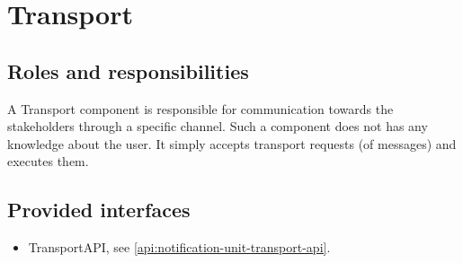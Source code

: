 \section{Transport}
\label{element:transport}

\subsection{Roles and responsibilities}

\npar A Transport component is responsible for communication towards the
stakeholders through a specific channel. Such a component does not has any
knowledge about the user. It simply accepts transport requests (of messages) and
executes them.

\subsection{Provided interfaces}

\begin{itemize}
  \item TransportAPI, see \ref{api:notification-unit-transport-api}.
\end{itemize}